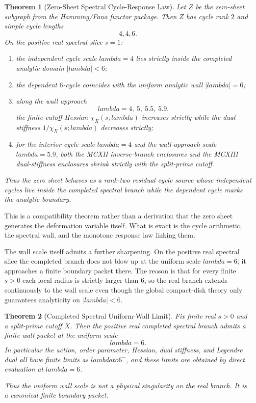\documentclass[12pt,a4paper]{article}
\def\lambda{lambda}%
\def\to{ to }%
\newtheorem{theorem}{Theorem}[section]
\theoremstyle{definition}
\begin{document}
\begin{theorem}[Zero-Sheet Spectral Cycle-Response Law]
Let $Z$ be the zero-sheet subgraph from the Hamming/Fano functor package. Then $Z$ has cycle rank $2$ and simple cycle lengths
\[
4,4,6.
\]
On the positive real spectral slice $s=1$:
\begin{enumerate}
\item the independent cycle scale $\lambda=4$ lies strictly inside the completed analytic domain $|\lambda|<6$;
\item the dependent $6$-cycle coincides with the uniform analytic wall $|\lambda|=6$;
\item along the wall approach
\[
\lambda=4,\ 5,\ 5.5,\ 5.9,
\]
the finite-cutoff Hessian $\chi_X(s;\lambda)$ increases strictly while the dual stiffness $1/\chi_X(s;\lambda)$ decreases strictly;
\item for the interior cycle scale $\lambda=4$ and the wall-approach scale $\lambda=5.9$, both the MCXII inverse-branch enclosures and the MCXIII dual-stiffness enclosures shrink strictly with the split-prime cutoff.
\end{enumerate}
Thus the zero sheet behaves as a rank-two residual cycle source whose independent cycles live inside the completed spectral branch while the dependent cycle marks the analytic boundary.
\end{theorem}

This is a compatibility theorem rather than a derivation that the zero sheet generates the deformation variable itself. What is exact is the cycle arithmetic, the spectral wall, and the monotone response law linking them.

The wall scale itself admits a further sharpening. On the positive real spectral slice the completed branch does not blow up at the uniform scale $\lambda=6$; it approaches a finite boundary packet there. The reason is that for every finite $s>0$ each local radius is strictly larger than $6$, so the real branch extends continuously to the wall scale even though the global compact-disk theory only guarantees analyticity on $|\lambda|<6$.

\begin{theorem}[Completed Spectral Uniform-Wall Limit]
Fix finite real $s>0$ and a split-prime cutoff $X$. Then the positive real completed spectral branch admits a finite wall packet at the uniform scale
\[
\lambda=6.
\]
In particular the action, order parameter, Hessian, dual stiffness, and Legendre dual all have finite limits as $\lambda\to6^{-}$, and these limits are obtained by direct evaluation at $\lambda=6$.

Thus the uniform wall scale is not a physical singularity on the real branch. It is a canonical finite boundary packet.
\end{theorem}
\end{document}
